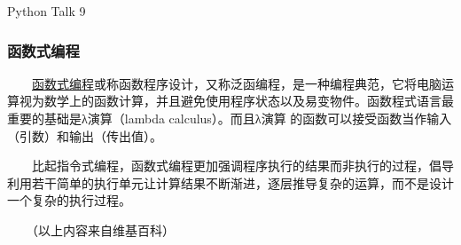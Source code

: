 


\begin{CJK}{UTF8}{gbsn}

\PreFirstFrame
\begin{frame} [fragile]
	\centerline{\fontsize{42}{42}\selectfont Python Talk 9}
\end{frame}
\PostFirstFrame

\begin{frame} [fragile]
	\frametitle{函数式编程}
	　　\href{https://zh.wikipedia.org/wiki/\%E5\%87\%BD\%E6\%95\%B0\%E5\%BC\%8F\%E7\%BC\%96\%E7\%A8\%8B}{函数式编程}或称函数程序设计，又称泛函编程，是一种编程典范，它将电脑运算视为数学上的函数计算，并且避免使用程序状态以及易变物件。函数程式语言最重要的基础是λ演算（lambda calculus）。而且λ演算     的函数可以接受函数当作输入（引数）和输出（传出值）。

	　　比起指令式编程，函数式编程更加强调程序执行的结果而非执行的过程，倡导利用若干简单的执行单元让计算结果不断渐进，逐层推导复杂的运算，而不是设计一个复杂的执行过程。

	　　（以上内容来自维基百科）
\end{frame}


\end{CJK}
